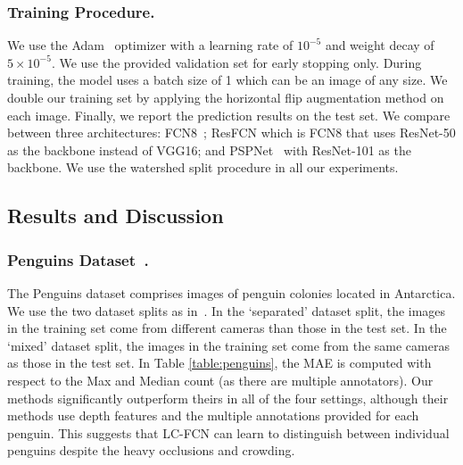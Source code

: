\documentclass[runningheads]{llncs}
\begin{document}
\subsubsection{Training Procedure.}
We use the Adam~\cite{kingma2014adam} optimizer with a learning rate of $10^{-5}$ and weight decay of $5\times10^{-5}$. We use the provided validation set for early stopping only. During training, the model uses a batch size of 1 which can be an image of any size. We double our training set by applying the horizontal flip augmentation method on each image. Finally, we report the prediction results on the test set. We compare between three architectures: FCN8~\cite{long2015fully}; ResFCN which is FCN8 that uses ResNet-50 as the backbone instead of VGG16; and PSPNet~\cite{zhao2017pyramid} with ResNet-101 as the backbone. We use the watershed split procedure in all our experiments.


\subsection{Results and Discussion}\label{sec:results}




\subsubsection{Penguins Dataset~\cite{arteta2016counting}.}
The Penguins dataset comprises images of penguin colonies located in Antarctica. We use the two dataset splits as in~\cite{arteta2016counting}. In the `separated' dataset split, the images in the training set come from different cameras than those in the test set. In the `mixed' dataset split, the images in the training set come from the same cameras as those in the test set. In Table \ref{table:penguins}, the MAE is computed with respect to the Max and Median count (as there are multiple annotators). Our methods significantly outperform theirs in all of the four settings, although their methods use depth features and the multiple annotations provided for each penguin. This suggests that LC-FCN can learn to distinguish between individual penguins despite the heavy occlusions and crowding.
\end{document}
